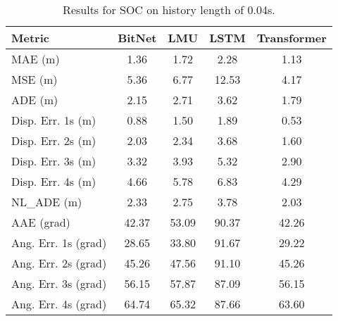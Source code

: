 \begin{table}[H]
\centering
\caption{Results for SOC on history length of 0.04s.}
\label{hist:SOC_0.04s}
\begin{tabular}{l||c|c|c|c}
Metric & BitNet & LMU & LSTM & Transformer \\
\hline \hline 
MAE (m) & 1.36 & 1.72 & 2.28 & 1.13 \\
MSE (m) & 5.36 & 6.77 & 12.53 & 4.17 \\
ADE (m) & 2.15 & 2.71 & 3.62 & 1.79 \\
Disp. Err. 1s (m) & 0.88 & 1.50 & 1.89 & 0.53 \\
Disp. Err. 2s (m) & 2.03 & 2.34 & 3.68 & 1.60 \\
Disp. Err. 3s (m) & 3.32 & 3.93 & 5.32 & 2.90 \\
Disp. Err. 4s (m) & 4.66 & 5.78 & 6.83 & 4.29 \\
NL\_ADE (m) & 2.33 & 2.75 & 3.78 & 2.03 \\
AAE (grad) & 42.37 & 53.09 & 90.37 & 42.26 \\
Ang. Err. 1s (grad) & 28.65 & 33.80 & 91.67 & 29.22 \\
Ang. Err. 2s (grad) & 45.26 & 47.56 & 91.10 & 45.26 \\
Ang. Err. 3s (grad) & 56.15 & 57.87 & 87.09 & 56.15 \\
Ang. Err. 4s (grad) & 64.74 & 65.32 & 87.66 & 63.60 \\
\end{tabular}
\end{table}
